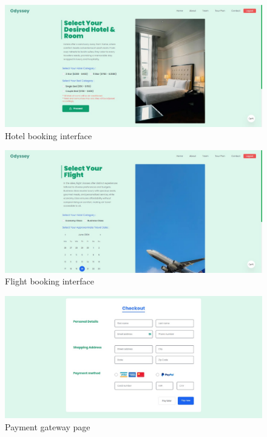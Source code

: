 \documentclass{scrreprt}
\begin{document}
\begin{figure}[h!]
    \centering
    \includegraphics[width=1.1\textwidth, height=0.4\textheight]{./SS/hotel.jpg}
    \caption{Hotel booking interface}
    \label{fig:hotel}
\end{figure}

\begin{figure}[h!]
    \centering
    \includegraphics[width=1.1\textwidth, height=0.4\textheight]{./SS/flight.jpg}
    \caption{Flight booking interface}
    \label{fig:flight}
\end{figure}

\begin{figure}[h!]
    \centering
    \includegraphics[width=1.1\textwidth, height=0.4\textheight]{./SS/payment.jpg}
    \caption{Payment gateway page}
    \label{fig:payment}
\end{figure}
\end{document}
